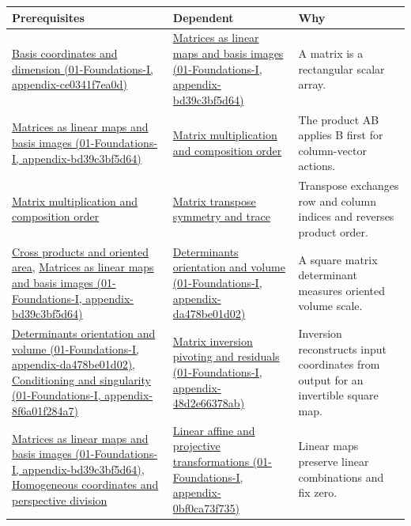 {\def\LTcaptype{none} %
\begin{longtable}[]{@{}
  >{\raggedright\arraybackslash}p{}
  >{\raggedright\arraybackslash}p{}
  >{\raggedright\arraybackslash}p{}@{}}
\toprule\noalign{}
\begin{minipage}[b]{\linewidth}\raggedright
Prerequisites
\end{minipage} & \begin{minipage}[b]{\linewidth}\raggedright
Dependent
\end{minipage} & \begin{minipage}[b]{\linewidth}\raggedright
Why
\end{minipage} \\
\midrule\noalign{}
\endhead
\bottomrule\noalign{}
\endlastfoot
\href{}{Basis coordinates and dimension (01-Foundations-I, appendix-ce0341f7ea0d)} & \href{}{Matrices as linear maps and basis images (01-Foundations-I, appendix-bd39c3bf5d64)} & A matrix is a rectangular scalar array. \\
\href{}{Matrices as linear maps and basis images (01-Foundations-I, appendix-bd39c3bf5d64)} & \hyperref[appendix-ab31ef447dbf]{Matrix multiplication and composition order} & The product AB applies B first for column-vector actions. \\
\hyperref[appendix-ab31ef447dbf]{Matrix multiplication and composition order} & \hyperref[appendix-175ca5ff874d]{Matrix transpose symmetry and trace} & Transpose exchanges row and column indices and reverses product order. \\
\hyperref[appendix-2391db8052b1]{Cross products and oriented area}, \href{}{Matrices as linear maps and basis images (01-Foundations-I, appendix-bd39c3bf5d64)} & \href{}{Determinants orientation and volume (01-Foundations-I, appendix-da478be01d02)} & A square matrix determinant measures oriented volume scale. \\
\href{}{Determinants orientation and volume (01-Foundations-I, appendix-da478be01d02)}, \href{}{Conditioning and singularity (01-Foundations-I, appendix-8f6a01f284a7)} & \href{}{Matrix inversion pivoting and residuals (01-Foundations-I, appendix-48d2e66378ab)} & Inversion reconstructs input coordinates from output for an invertible square map. \\
\href{}{Matrices as linear maps and basis images (01-Foundations-I, appendix-bd39c3bf5d64)}, \hyperref[appendix-cb3b26862282]{Homogeneous coordinates and perspective division} & \href{}{Linear affine and projective transformations (01-Foundations-I, appendix-0bf0ca73f735)} & Linear maps preserve linear combinations and fix zero. \\

\end{longtable}}
